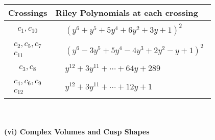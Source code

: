 \documentclass[1p]{elsarticle_modified}
\theoremstyle{definition}
\begin{document}
\begin{tabular}{m{50pt}|m{274pt}}
Crossings & \hspace{64pt}Riley Polynomials at each crossing \\
\hline $$\begin{aligned}c_{1},c_{10}\end{aligned}$$&$\begin{aligned}
&(y^6+y^5+5 y^4+6 y^2+3 y+1)^2
\end{aligned}$\\
\hline $$\begin{aligned}c_{2},c_{5},c_{7}\\c_{11}\end{aligned}$$&$\begin{aligned}
&(y^6-3 y^5+5 y^4-4 y^3+2 y^2- y+1)^2
\end{aligned}$\\
\hline $$\begin{aligned}c_{3},c_{8}\end{aligned}$$&$\begin{aligned}
&y^{12}+3 y^{11}+\cdots+64 y+289
\end{aligned}$\\
\hline $$\begin{aligned}c_{4},c_{6},c_{9}\\c_{12}\end{aligned}$$&$\begin{aligned}
&y^{12}+3 y^{11}+\cdots+12 y+1
\end{aligned}$\\
\hline
\end{tabular}\\~\\
\newpage\flushleft \textbf{(vi) Complex Volumes and Cusp Shapes}
\end{document}
